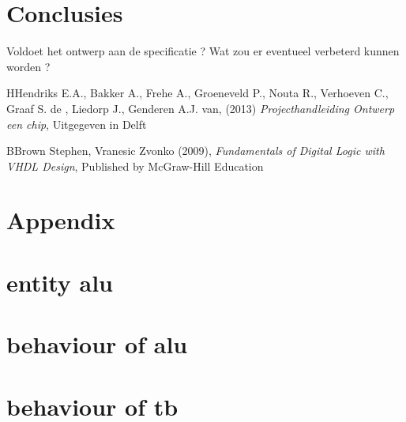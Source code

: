 \documentclass[11pt,twoside,a4paper]{article}
\begin{document}
\section{Conclusies}

Voldoet het ontwerp aan de specificatie ?
Wat zou er eventueel verbeterd kunnen worden ?

\begin{thebibliography}{7} %
%
\bibitem 
HHendriks E.A., Bakker A., Frehe A., Groeneveld P., Nouta R., Verhoeven C., Graaf S. de , Liedorp J., Genderen A.J. van,  (2013) \textit{Projecthandleiding Ontwerp een chip}, Uitgegeven in Delft

\bibitem 
BBrown Stephen, Vranesic Zvonko (2009), \textit{Fundamentals of Digital Logic with VHDL Design}, Published by McGraw-Hill Education



\end{thebibliography}






\newpage

\section{Appendix}
\appendix
\section{entity alu}
\label{entity}



\section{behaviour of alu}
\label{behaviour}


\section{behaviour of tb}
\label{tb}

\end{document}
